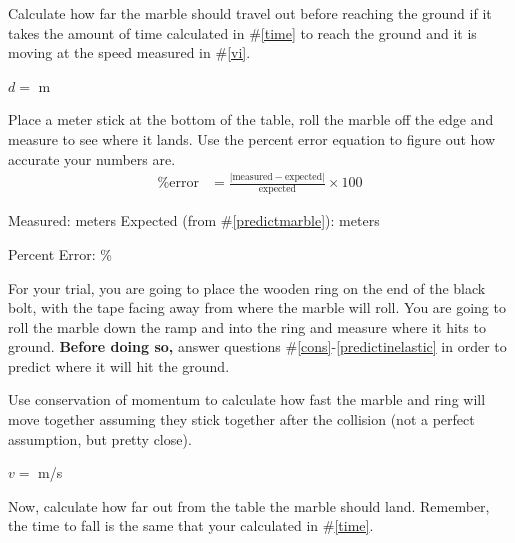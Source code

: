 \documentclass[10pt]{exam}
\begin{document}
\begin{questions}
\question \label{predictmarble}
Calculate how far the marble should travel out before reaching the ground if it takes the amount of time calculated in \#\ref{time} to reach the ground and it is moving at the speed measured in \#\ref{vi}.
\vs

\begin{flushright}
  $d =$ \fillin[][8em] m
\end{flushright}

\question
Place a meter stick at the bottom of the table, roll the marble off the edge and measure to see where it lands. Use the percent error equation to figure out how accurate your numbers are.
%
\begin{align*}
  \text{\% error} &=  
  \frac{
    \left|\text{measured}-\text{expected}\right|
    }{
      \text{expected}
    } 
  \times 100
\end{align*}

\begin{center}
  Measured: \fillin[][8em] meters
  \hspace{4em}
  Expected (from \#\ref{predictmarble}): \fillin[][8em]  meters
  \vspace{2em}
\end{center}


\begin{flushright}
  Percent Error: \fillin[][5em]\%
\end{flushright}

\pagebreak

\begin{EnvUplevel}
  For your trial, you are going to place the wooden ring on the end of the black bolt, with the tape facing away from where the marble will roll. You are going to roll the marble down the ramp and into the ring and measure where it hits to ground.  {\bf Before doing so,} answer questions \#\ref{cons}-\ref{predictinelastic} in order to predict where it will hit the ground.
\end{EnvUplevel}


\question \label{cons}
Use conservation of momentum to calculate how fast the marble and ring will move together assuming they stick together after the collision (not a perfect assumption, but pretty close).
\vs[3]

\begin{flushright}
  $v =$ \fillin[][8em] m/s
\end{flushright}


\question \label{predictinelastic}
Now, calculate how far out from the table the marble should land. Remember, the time to fall is the same that your calculated in \#\ref{time}.
\vs


\end{questions}
\end{document}
